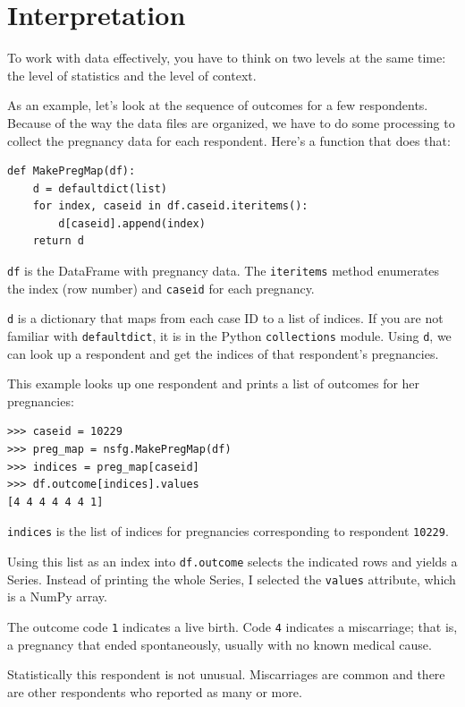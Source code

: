 \documentclass[12pt]{book}
\theoremstyle{exercise}
\begin{document}
\section{Interpretation}

To work with data effectively, you have to think on two levels at the
same time: the level of statistics and the level of context.

As an example, let's look at the sequence of outcomes for a few
respondents.  Because of the way the data files are organized, we have
to do some processing to collect the pregnancy data for each respondent.
Here's a function that does that:

\begin{verbatim}
def MakePregMap(df):
    d = defaultdict(list)
    for index, caseid in df.caseid.iteritems():
        d[caseid].append(index)
    return d
\end{verbatim}

{\tt df} is the DataFrame with pregnancy data.  The {\tt iteritems}
method enumerates the index (row number)
and {\tt caseid} for each pregnancy.%

{\tt d} is a dictionary that maps from each case ID to a list of
indices.  If you are not familiar with {\tt defaultdict}, it is in
the Python {\tt collections} module.
Using {\tt d}, we can look up a respondent and get the
indices of that respondent's pregnancies.

This example looks up one respondent and prints a list of outcomes
for her pregnancies:

\begin{verbatim}
>>> caseid = 10229
>>> preg_map = nsfg.MakePregMap(df)
>>> indices = preg_map[caseid]
>>> df.outcome[indices].values
[4 4 4 4 4 4 1]
\end{verbatim}

{\tt indices} is the list of indices for pregnancies corresponding
to respondent {\tt 10229}.

Using this list as an index into {\tt df.outcome} selects the
indicated rows and yields a Series.  Instead of printing the
whole Series, I selected the {\tt values} attribute, which is
a NumPy array.%
%

The outcome code {\tt 1} indicates a live birth. Code {\tt 4} indicates
a miscarriage; that is, a pregnancy that ended spontaneously, usually
with no known medical cause.

Statistically this respondent is not unusual.  Miscarriages are common
and there are other respondents who reported as many or more.
\end{document}
